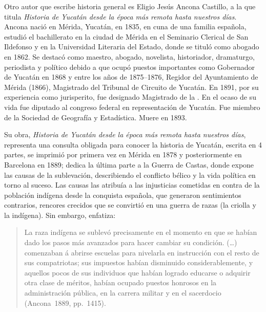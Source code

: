 Otro autor que escribe historia general es Eligio Jesús
Ancona Castillo, a la que titula \textit{Historia de Yucatán desde la
época más remota hasta nuestros días}. Ancona nació en  Mérida, Yucatán, en
1835, en cuna de una familia española,  estudió el
bachillerato en la ciudad de Mérida en el Seminario Clerical de San
Ildefonso y en la Universidad Literaria del Estado, donde  se tituló como
abogado en 1862. Se destacó como maestro, abogado, novelista, historiador,
dramaturgo, periodista y político debido a que ocupó puestos importantes
como Gobernador de Yucatán en 1868 y entre los años de 1875--1876, Regidor
del Ayuntamiento de Mérida (1866), Magistrado del Tribunal de Circuito de
Yucatán. En 1891,  por su experiencia como jurisperito, fue designado
Magistrado de la \href{http://es.wikipedia.org/wiki/Suprema_Corte_de_Justicia_de_la_Nación}{}. En el ocaso de su vida
 fue diputado al congreso federal en representación de
Yucatán. Fue miembro de la Sociedad de Geografía y Estadística. Muere en
1893.

\enlargethispage{1\baselineskip}
Su obra, \textit{Historia de Yucatán desde la época más remota hasta
nuestros días}, representa una consulta obligada para conocer la historia
de Yucatán, escrita en 4 partes, se imprimió por primera vez en Mérida en
1878 y posteriormente en Barcelona en 1889; dedica la última parte a la
Guerra de Castas, donde expone las causas de la sublevación, describiendo
el conflicto bélico y la vida política en torno al suceso. Las causas las
atribuía a las  injusticias cometidas en contra de la población indígena
desde la conquista española, que generaron sentimientos contrarios,
rencores crecidos que se convirtió en una guerra de razas (la criolla y la
indígena). Sin embargo,  enfatiza:


\begin{quotation}
La raza indígena se sublevó precisamente en el momento en que se habían dado
los pasos más avanzados para hacer cambiar su condición. (\ldots) comenzaban á
abrirse escuelas para nivelarla en instrucción con el resto de sus
compatriotas; sus impuestos habían disminuido considerablemente, y aquellos
pocos de sus individuos que habían logrado educarse o adquirir otra clase
de méritos, habían ocupado puestos honrosos en la administración pública,
en la carrera militar y en el sacerdocio (Ancona~1889, pp.~14\textendash{}15).
\end{quotation}


